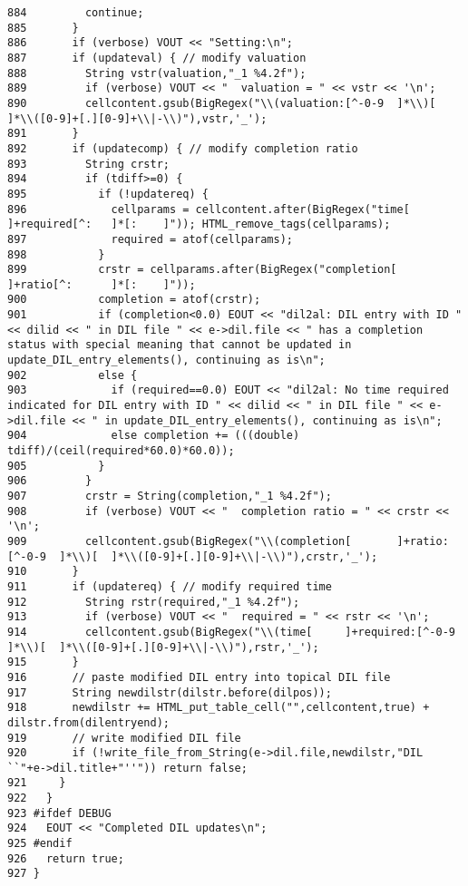 \begin{verbatim}
884         continue;
885       }
886       if (verbose) VOUT << "Setting:\n";
887       if (updateval) { // modify valuation
888         String vstr(valuation,"_1 %4.2f");
889         if (verbose) VOUT << "  valuation = " << vstr << '\n';
890         cellcontent.gsub(BigRegex("\\(valuation:[^-0-9  ]*\\)[  ]*\\([0-9]+[.][0-9]+\\|-\\)"),vstr,'_');
891       }
892       if (updatecomp) { // modify completion ratio
893         String crstr;
894         if (tdiff>=0) {
895           if (!updatereq) {
896             cellparams = cellcontent.after(BigRegex("time[      ]+required[^:   ]*[:    ]")); HTML_remove_tags(cellparams);
897             required = atof(cellparams);
898           }
899           crstr = cellparams.after(BigRegex("completion[        ]+ratio[^:      ]*[:    ]"));
900           completion = atof(crstr);
901           if (completion<0.0) EOUT << "dil2al: DIL entry with ID " << dilid << " in DIL file " << e->dil.file << " has a completion status with special meaning that cannot be updated in update_DIL_entry_elements(), continuing as is\n";
902           else {
903             if (required==0.0) EOUT << "dil2al: No time required indicated for DIL entry with ID " << dilid << " in DIL file " << e->dil.file << " in update_DIL_entry_elements(), continuing as is\n";
904             else completion += (((double) tdiff)/(ceil(required*60.0)*60.0));
905           }
906         }
907         crstr = String(completion,"_1 %4.2f");
908         if (verbose) VOUT << "  completion ratio = " << crstr << '\n';
909         cellcontent.gsub(BigRegex("\\(completion[       ]+ratio:[^-0-9  ]*\\)[  ]*\\([0-9]+[.][0-9]+\\|-\\)"),crstr,'_');
910       }
911       if (updatereq) { // modify required time
912         String rstr(required,"_1 %4.2f");
913         if (verbose) VOUT << "  required = " << rstr << '\n';
914         cellcontent.gsub(BigRegex("\\(time[     ]+required:[^-0-9       ]*\\)[  ]*\\([0-9]+[.][0-9]+\\|-\\)"),rstr,'_');
915       }
916       // paste modified DIL entry into topical DIL file
917       String newdilstr(dilstr.before(dilpos));
918       newdilstr += HTML_put_table_cell("",cellcontent,true) + dilstr.from(dilentryend);
919       // write modified DIL file
920       if (!write_file_from_String(e->dil.file,newdilstr,"DIL ``"+e->dil.title+"''")) return false;
921     }
922   }
923 #ifdef DEBUG
924   EOUT << "Completed DIL updates\n";
925 #endif
926   return true;
927 }
\end{verbatim}\normalsize 
{}
